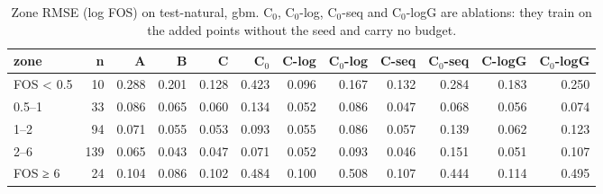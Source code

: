 \begin{table}[htbp]
\centering
\small
\setlength{\tabcolsep}{4pt}
\caption{Zone RMSE (log FOS) on test-natural, gbm. C$_0$, C$_0$-log, C$_0$-seq and C$_0$-logG are ablations: they train on the added points without the seed and carry no budget.}
\label{tab:test-natural__fos-rmse:zones_log:gbm}
\begin{tabular}{lrrrrrrrrrrr}
\toprule
zone & n & A & B & C & C$_0$ & C-log & C$_0$-log & C-seq & C$_0$-seq & C-logG & C$_0$-logG \\
\midrule
FOS < 0.5 & 10 & 0.288 & 0.201 & 0.128 & 0.423 & 0.096 & 0.167 & 0.132 & 0.284 & 0.183 & 0.250 \\
0.5–1 & 33 & 0.086 & 0.065 & 0.060 & 0.134 & 0.052 & 0.086 & 0.047 & 0.068 & 0.056 & 0.074 \\
1–2 & 94 & 0.071 & 0.055 & 0.053 & 0.093 & 0.055 & 0.086 & 0.057 & 0.139 & 0.062 & 0.123 \\
2–6 & 139 & 0.065 & 0.043 & 0.047 & 0.071 & 0.052 & 0.093 & 0.046 & 0.151 & 0.051 & 0.107 \\
FOS ≥ 6 & 24 & 0.104 & 0.086 & 0.102 & 0.484 & 0.100 & 0.508 & 0.107 & 0.444 & 0.114 & 0.495 \\
\bottomrule
\end{tabular}
\end{table}

